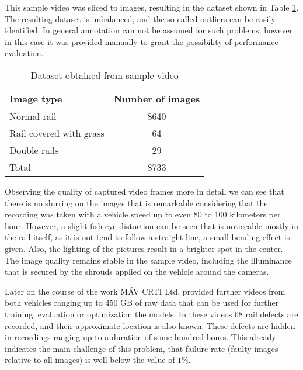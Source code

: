 This sample video was sliced to images, resulting in the dataset shown in Table \ref{table:dataset}.
The resulting dataset is imbalanced, and the so-called outliers can be easily identified.
In general annotation can not be assumed for such problems, however in this case it was
provided manually to grant the possibility of performance evaluation.

\begin{table}[!ht]
    \centering
    \begin{tabular}{l c}
        Image type              & Number of images \\
        \hline
        Normal rail             & 8640             \\
        Rail covered with grass & 64               \\
        Double rails            & 29               \\
        \hline
        Total                   & 8733             \\
    \end{tabular}
    \caption{Dataset obtained from sample video}
    \label{table:dataset}
\end{table}

Observing the quality of captured video frames more in detail we can see that
there is no slurring on the images that is remarkable considering that the recording was taken
with a vehicle speed up to even 80 to 100 kilometers per hour.
However, a slight fish eye distortion can be seen that is noticeable mostly in the rail itself,
as it is not tend to follow a straight line, a small bending effect is given.
Also, the lighting of the pictures result in a brighter spot in the center.
The image quality remains stable in the sample video, including the illuminance that is
secured by the shrouds applied on the vehicle around the cameras.

Later on the course of the work MÁV CRTI Ltd. provided further videos from both vehicles
ranging up to 450 GB of raw data that can be used for further training, evaluation or optimization
the models.
In these videos 68 rail defects are recorded, and their approximate location is also known.
These defects are hidden in recordings ranging up to a duration of some hundred hours.
This already indicates the main challenge of this problem, that failure rate (faulty images relative
to all images) is well below the value of $1\%$.